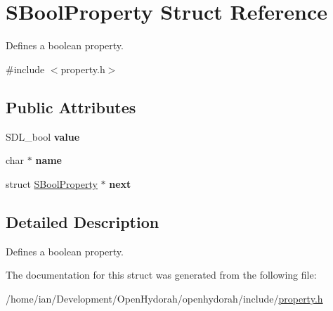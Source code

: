 \hypertarget{structSBoolProperty}{\section{S\-Bool\-Property Struct Reference}
\label{structSBoolProperty}
}


Defines a boolean property.  




{\ttfamily \#include $<$property.\-h$>$}

\subsection*{Public Attributes}
\begin{DoxyCompactItemize}
\item 
\hypertarget{structSBoolProperty_a42f92d5b1bbb8148704bfe991bb477fe}{S\-D\-L\-\_\-bool {\bfseries value}}\label{structSBoolProperty_a42f92d5b1bbb8148704bfe991bb477fe}

\item 
\hypertarget{structSBoolProperty_a283eb8c7a3563f8a3453f18de36c54af}{char $\ast$ {\bfseries name}}\label{structSBoolProperty_a283eb8c7a3563f8a3453f18de36c54af}

\item 
\hypertarget{structSBoolProperty_aa9737e6829ada86005debf052f9cb555}{struct \hyperlink{structSBoolProperty}{S\-Bool\-Property} $\ast$ {\bfseries next}}\label{structSBoolProperty_aa9737e6829ada86005debf052f9cb555}

\end{DoxyCompactItemize}


\subsection{Detailed Description}
Defines a boolean property. 

The documentation for this struct was generated from the following file\-:\begin{DoxyCompactItemize}
\item 
/home/ian/\-Development/\-Open\-Hydorah/openhydorah/include/\hyperlink{property_8h}{property.\-h}\end{DoxyCompactItemize}
